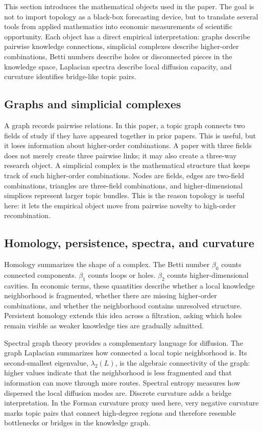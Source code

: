 \documentclass[preprint,12pt,authoryear]{elsarticle}
\begin{document}
This section introduces the mathematical objects used in the paper. The goal is not to import topology as a black-box forecasting device, but to translate several tools from applied mathematics into economic measurements of scientific opportunity. Each object has a direct empirical interpretation: graphs describe pairwise knowledge connections, simplicial complexes describe higher-order combinations, Betti numbers describe holes or disconnected pieces in the knowledge space, Laplacian spectra describe local diffusion capacity, and curvature identifies bridge-like topic pairs.

\subsection{Graphs and simplicial complexes}

A graph records pairwise relations. In this paper, a topic graph connects two fields of study if they have appeared together in prior papers. This is useful, but it loses information about higher-order combinations. A paper with three fields does not merely create three pairwise links; it may also create a three-way research object. A simplicial complex is the mathematical structure that keeps track of such higher-order combinations. Nodes are fields, edges are two-field combinations, triangles are three-field combinations, and higher-dimensional simplices represent larger topic bundles. This is the reason topology is useful here: it lets the empirical object move from pairwise novelty to high-order recombination.

\subsection{Homology, persistence, spectra, and curvature}

Homology summarizes the shape of a complex. The Betti number $\beta_0$ counts connected components. $\beta_1$ counts loops or holes. $\beta_2$ counts higher-dimensional cavities. In economic terms, these quantities describe whether a local knowledge neighborhood is fragmented, whether there are missing higher-order combinations, and whether the neighborhood contains unresolved structure. Persistent homology extends this idea across a filtration, asking which holes remain visible as weaker knowledge ties are gradually admitted.

Spectral graph theory provides a complementary language for diffusion. The graph Laplacian summarizes how connected a local topic neighborhood is. Its second-smallest eigenvalue, $\lambda_2(L)$, is the algebraic connectivity of the graph: higher values indicate that the neighborhood is less fragmented and that information can move through more routes. Spectral entropy measures how dispersed the local diffusion modes are. Discrete curvature adds a bridge interpretation. In the Forman curvature proxy used here, very negative curvature marks topic pairs that connect high-degree regions and therefore resemble bottlenecks or bridges in the knowledge graph.
\end{document}
